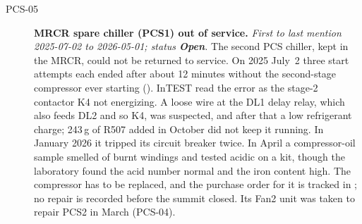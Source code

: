 \begin{description}
\item[PCS-05]\label{iss:PCS-05} \textbf{MRCR spare chiller (PCS1) out of service.}
  \emph{First to last mention 2025-07-02 to 2026-05-01; status \textcolor{stopn}{\textbf{Open}}.}
  The second PCS chiller, kept in the MRCR, could not be returned to service.  On 2025 July~2 three start attempts each ended after about 12 minutes without the second-stage compressor ever starting ().  InTEST read the error as the stage-2 contactor K4 not energizing.  A loose wire at the DL1 delay relay, which also feeds DL2 and so K4, was suspected, and after that a low refrigerant charge; 243\,g of R507 added in October did not keep it running.  In January 2026 it tripped its circuit breaker twice.  In April a compressor-oil sample smelled of burnt windings and tested acidic on a kit, though the laboratory found the acid number normal and the iron content high.  The compressor has to be replaced, and the purchase order for it is tracked in ; no repair is recorded before the summit closed.  Its Fan2 unit was taken to repair PCS2 in March (PCS-04).

\end{description}

